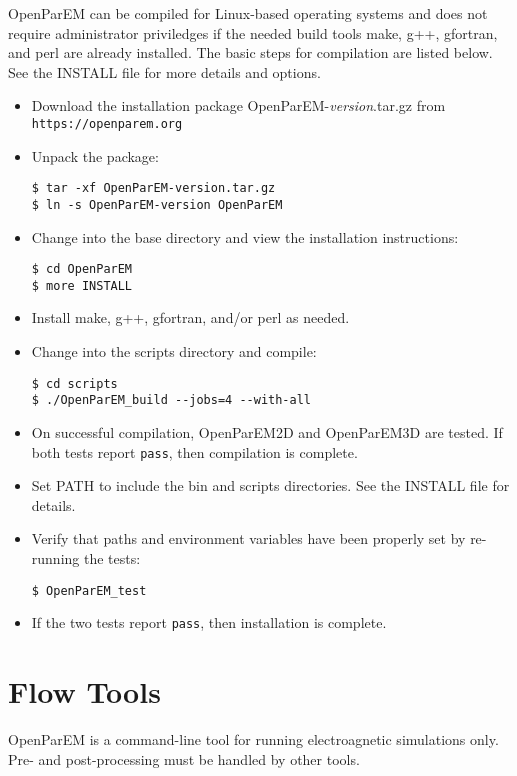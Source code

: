 \documentclass[titlepage]{article}
\renewcommand\_{\textunderscore\linebreak[1]}
\begin{document}
OpenParEM can be compiled for Linux-based operating systems and does not require administrator priviledges if the needed build tools make, g++, gfortran, and perl are already installed.
The basic steps for compilation are listed below.  See the INSTALL file for more details and options.
\begin{itemize}[nosep]
   \item Download the installation package OpenParEM-\textit{version}.tar.gz from \verb+https://openparem.org+
   \item Unpack the package:
         \begin{Verbatim}
$ tar -xf OpenParEM-version.tar.gz
$ ln -s OpenParEM-version OpenParEM
         \end{Verbatim}
   \item Change into the base directory and view the installation instructions:
         \begin{Verbatim}
$ cd OpenParEM
$ more INSTALL
         \end{Verbatim}
   \item Install make, g++, gfortran, and/or perl as needed.
   \item Change into the scripts directory and compile:
         \begin{Verbatim}
$ cd scripts
$ ./OpenParEM_build --jobs=4 --with-all
         \end{Verbatim}
   \item On successful compilation, OpenParEM2D and OpenParEM3D are tested.  If both tests report \texttt{pass}, then compilation is complete.
   \item Set PATH to include the bin and scripts directories.  See the INSTALL file for details.
   \item Verify that paths and environment variables have been properly set by re-running the tests:
         \begin{Verbatim}
$ OpenParEM_test
         \end{Verbatim}
   \item If the two tests report \texttt{pass}, then installation is complete.
\end{itemize}

\section{Flow Tools}

OpenParEM is a command-line tool for running electroagnetic simulations only.  Pre- and post-processing must be handled by other tools.
\end{document}
